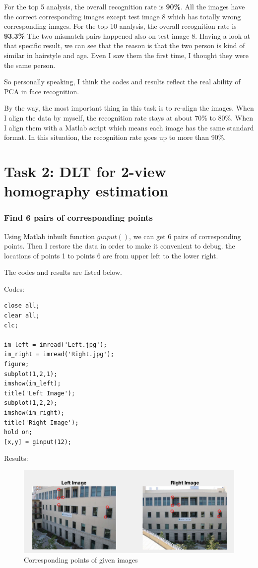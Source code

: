 \documentclass{article}
\begin{document}
For the top 5 analysis, the overall recognition rate is \textbf{90\%}. All the images have the correct corresponding images except test image 8 which has totally wrong corresponding images. For the top 10 analysis, the overall recognition rate is \textbf{93.3\%}
The two mismatch pairs happened also on test image 8. Having a look at that specific result, we can see that the reason is that the two person is kind of similar in hairstyle and age. Even I saw them the first time, I thought they were the same person.

So personally speaking, I think the codes and results reflect the real ability of PCA in face recognition.

By the way, the most important thing in this task is to re-align the images. When I align the data by myself, the recognition rate stays at about 70\% to 80\%. When I align them with a Matlab script which means each image has the same standard format. In this situation, the recognition rate goes up to more than 90\%.

\section*{Task 2: DLT for 2-view homography estimation}

\subsubsection*{Find 6 pairs of corresponding points}
Using Matlab inbuilt function $ginput()$, we can get 6 pairs of corresponding points. Then I restore the data in order to make it convenient to debug. the locations of points 1 to points 6 are from upper left to the lower right.

The codes and results are listed below.

Codes:
\begin{lstlisting}
close all;
clear all;
clc;

im_left = imread('Left.jpg');
im_right = imread('Right.jpg');
figure;
subplot(1,2,1);
imshow(im_left);
title('Left Image');
subplot(1,2,2);
imshow(im_right);
title('Right Image');
hold on;
[x,y] = ginput(12);
\end{lstlisting}

Results:
\begin{figure}[htbp]
    \centering
    \includegraphics[scale = 0.6]{t2_1.png}
    \caption{Corresponding points of given images}
    \label{fig27}
\end{figure}
\end{document}
